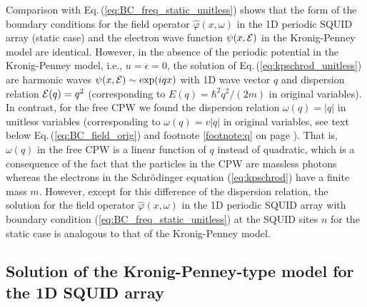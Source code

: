 Comparison with Eq.\,(\ref{eq:BC_freq_static_unitless}) shows that the form of the boundary
conditions for the field operator $\hat{\varphi}(x, \omega)$ in the 1D periodic SQUID array
(static case)
and the electron wave function $\psi(x,{\cal E})$ in the Kronig-Penney model 
are identical. However,
in the absence of the periodic potential in the Kronig-Penney model, i.e., $u=\epsilon=0$, 
the solution of Eq.\,(\ref{eq:kpschrod_unitless}) 
are harmonic waves $\psi(x,{\cal E}) \sim \exp(i q x)$ with 1D wave vector $q$ and dispersion relation 
${\cal E}(q) = q^2$ (corresponding to 
$\displaystyle E(q) = \hbar^2 q^2 / (2 m)$ in original variables).
In contrast, for the free CPW we found the dispersion relation
$\omega(q) = |q|$ in unitless variables (corresponding to $\omega(q) = v |q|$ in original variables,
see text below Eq.\,(\ref{eq:BC_field_orig}) and footnote \ref{footnote:q} on page \pageref{footnote:q}).
That is, $\omega(q)$ in the free CPW is a linear 
function of $q$ instead of quadratic, which is a consequence of the fact that the particles 
in the CPW are massless photons whereas the electrons in the Schr\"odinger equation (\ref{eq:kpschrod})
have a finite mass $m$. 
%
However, except for this difference of the dispersion relation, the solution for the 
field operator $\hat{\varphi}(x, \omega)$ in the 1D periodic SQUID array 
with boundary condition (\ref{eq:BC_freq_static_unitless}) at the SQUID sites $n$ for the static case
is analogous to that of the Kronig-Penney model. 


\subsection{Solution of the Kronig-Penney-type model for the 1D SQUID array}
\label{subsec:kpsol}

